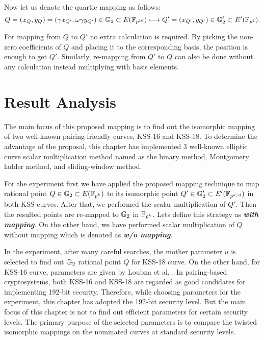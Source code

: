 Now let us denote the quartic mapping as follows:
\begin{equation}
Q = (x_Q,y_Q) = (\gamma x_{Q'}, \omega \gamma y_{Q'}) \in {\mathbb{G}}_{2} \subset E(\mathbb{F}_{p^{16}})   \longmapsto  Q' = (x_{Q'},y_{Q'}) \in {\mathbb{G}}_{2}'  \subset E'(\mathbb{F}_{p^4}).  \nonumber
\end{equation}

For mapping from $Q$ to $Q'$ no extra calculation is required. By picking the non-zero coefficients of $Q$ and placing it to the corresponding basis, the position is enough to get $Q'$. Similarly, re-mapping from $Q'$ to $Q$  can also be done without any calculation instead multiplying with basis elements.  

\section{Result Analysis}
The main focus of this proposed mapping is to find out the isomorphic mapping of two well-known pairing-friendly curves, KSS-16 and KSS-18. To determine the advantage of the proposal, this chapter has implemented 3 well-known elliptic curve scalar multiplication method named as the binary method, Montgomery ladder method, and sliding-window method.

For the experiment first we have applied the proposed mapping technique to map rational point $Q \in {\mathbb{G}}_{2} \subset E({\mathbb{F}}_{p^{k}})$ to its isomorphic point $Q' \in {\mathbb{G}}_{2}' \subset E'(\mathbb{F}_{p^{k/d}})$ in both KSS curves. After that, we performed the scalar multiplication of $Q'$. Then the resulted points are re-mapped to ${\mathbb{G}}_{2}$ in $\mathbb{F}_{p^k}$. Lets define this strategy as \textit{\textbf{with mapping}}.
On the other hand, we have performed scalar multiplication of $Q$ without mapping which is denoted as \textit{\textbf{w/o mapping}}.

In the experiment, after many careful searches, the mother parameter $u$ is selected to find out ${\mathbb{G}}_{2}$ rational point $Q$ for KSS-18 curve. On the other hand, for KSS-16 curve, parameters are given by Loubna et al. \cite{EPRINT:GhaFou16b}.
In pairing-based cryptosystems, both KSS-16 and KSS-18 are regarded as good candidates for implementing 192-bit security.
Therefore, while choosing parameters for the experiment, this chapter has adopted the 192-bit security level. 
But the main focus of this chapter is not to find out efficient parameters for certain security levels. 
The primary purpose of the selected parameters is to compare the twisted isomorphic mappings on the nominated curves at standard security levels. 

